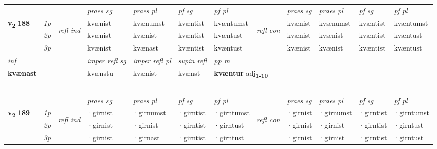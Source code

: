 \begin{longtable}[l]{X>{\footnotesize\itshape}llXXXXlXXXX}
\midrule

 & &   & \textit{praes sg}  & \textit{praes pl}    & \textit{ pf sg} & \textit{pf pl} & & \textit{praes sg}  & \textit{praes pl}    & \textit{pf sg} & \textit{pf pl }  \\ \cmidrule{4-7} \cmidrule{9-12}
 \multirow{2}{*}{{{\textbf{v{\textsubscript{2}}} \Large{\textbf{188}}}}}  & 1p & \multirow{3}{*}{\begin{turn}{90}\textit{refl ind}\end{turn}}  & kvænist & kvænumst & kvæntist & kvæntumst & \multirow{3}{*}{\begin{turn}{90}\textit{refl con}\end{turn}}  &kvænist & kvænumst & kvæntist & kvæntumst \\*
 & 2p &  & kvænist & kvænist & kvæntist & kvæntust & &kvænist & kvænist & kvæntist & kvæntust \\*
 & 3p  & & kvænist & kvænast & kvæntist & kvæntust & & kvænist & kvænist& kvæntist & kvæntust \\*
\cmidrule{4-7} \cmidrule{9-12}

   {\textit{inf}} & &   & \textit{imper refl sg} & \textit{imper refl pl}   & \textit{supin refl} & \textit{pp m} \\*
  {\textbf{kvænast}} & &   & kvænstu & kvænist   & kvænst & \multicolumn{2}{l}{\textbf{kvæntur} adj\textbf{\textsubscript{1-10}}} \\*

\midrule
  & \\*
   & \\*
     & \\*
   & \\*
  & \\
   \midrule
 & &   & \textit{praes sg}  & \textit{praes pl}    & \textit{ pf sg} & \textit{pf pl} & & \textit{praes sg}  & \textit{praes pl}    & \textit{pf sg} & \textit{pf pl }  \\ \cmidrule{4-7} \cmidrule{9-12}
 \multirow{2}{*}{{{\textbf{v{\textsubscript{2}}} \Large{\textbf{189}}}}}  & 1p & \multirow{3}{*}{\begin{turn}{90}\textit{refl ind}\end{turn}}  & ·girnist & ·girnumst & ·girntist & ·girntumst & \multirow{3}{*}{\begin{turn}{90}\textit{refl con}\end{turn}}  &·girnist & ·girnumst & ·girntist & ·girntumst \\*
 & 2p &  & ·girnist & ·girnist & ·girntist & ·girntust & &·girnist & ·girnist & ·girntist & ·girntust \\*
 & 3p  & & ·girnist & ·girnast & ·girntist & ·girntust & & ·girnist & ·girnist& ·girntist & ·girntust \\*
\cmidrule{4-7} \cmidrule{9-12}


\end{longtable}
